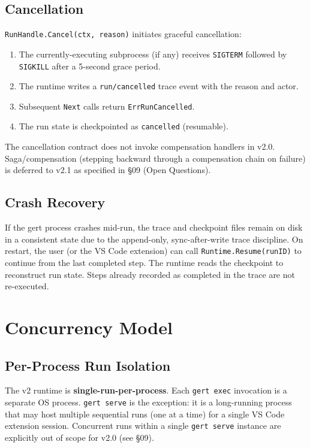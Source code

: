 \subsection{Cancellation}

\texttt{RunHandle.Cancel(ctx, reason)} initiates graceful cancellation:
\begin{enumerate}
  \item The currently-executing subprocess (if any) receives \texttt{SIGTERM} followed by
        \texttt{SIGKILL} after a 5-second grace period.
  \item The runtime writes a \texttt{run/cancelled} trace event with the reason and actor.
  \item Subsequent \texttt{Next} calls return \texttt{ErrRunCancelled}.
  \item The run state is checkpointed as \texttt{cancelled} (resumable).
\end{enumerate}

The cancellation contract does not invoke compensation handlers in v2.0. Saga/compensation
(stepping backward through a compensation chain on failure) is deferred to v2.1 as specified
in §09 (Open Questions).

\subsection{Crash Recovery}

If the gert process crashes mid-run, the trace and checkpoint files remain on disk in a
consistent state due to the append-only, sync-after-write trace discipline. On restart,
the user (or the VS Code extension) can call \texttt{Runtime.Resume(runID)} to continue
from the last completed step. The runtime reads the checkpoint to reconstruct run state.
Steps already recorded as completed in the trace are not re-executed.

\section{Concurrency Model}

\subsection{Per-Process Run Isolation}

The v2 runtime is \textbf{single-run-per-process}. Each \texttt{gert exec} invocation is a
separate OS process. \texttt{gert serve} is the exception: it is a long-running process that
may host multiple sequential runs (one at a time) for a single VS Code extension session.
Concurrent runs within a single \texttt{gert serve} instance are explicitly out of scope
for v2.0 (see §09).

